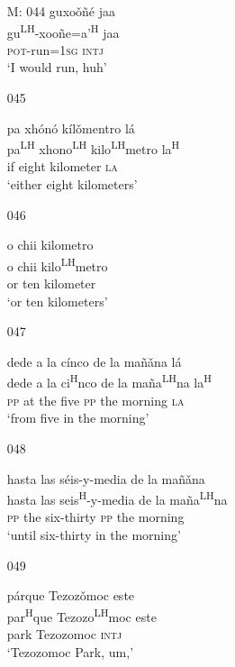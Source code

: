 \begin{itemize}
\item[M: 044]
\glll   guxo\v{o}\~{n}\'{e} jaa\\
gu\textsuperscript{LH}-xoo\~{n}e=a'\textsuperscript{H} jaa\\
\textsc{pot}-run=\textsc{1sg} \textsc{intj}\\
\glt `I would run, huh'
 

\item[045]
 
\glll  pa xh\'{o}n\'{o} k\'{i}l\v{o}mentro l\'{a}\\
pa\textsuperscript{LH} xhono\textsuperscript{LH} kilo\textsuperscript{LH}metro la\textsuperscript{H}\\
if eight kilometer \textsc{la}\\
\glt `either eight kilometers'
 

\item[046]
 
\glll   o chii kilometro\\
o chii kilo\textsuperscript{LH}metro\\
or ten kilometer\\
\glt `or ten kilometers'
 

\item[047]
 
\glll   dede a la c\'{i}nco de la ma\~{n}\v{a}na l\'{a}\\
dede a la ci\textsuperscript{H}nco de la ma\~{n}a\textsuperscript{LH}na la\textsuperscript{H}\\
\textsc{pp} at the five \textsc{pp} the morning \textsc{la}\\
\glt `from five in the morning'
 

\item[048]
 
\glll  hasta las s\'{e}is-y-media de la ma\~{n}\v{a}na\\
hasta las seis\textsuperscript{H}-y-media de la ma\~{n}a\textsuperscript{LH}na\\
\textsc{pp} the six-thirty \textsc{pp} the morning\\
\glt `until six-thirty in the morning'
 


\item[049]
 
\glll   p\'{a}rque Tezoz\v{o}moc este\\
par\textsuperscript{H}que Tezozo\textsuperscript{LH}moc este\\
park Tezozomoc \textsc{intj}\\
\glt `Tezozomoc Park, um,' 
 



\end{itemize}
